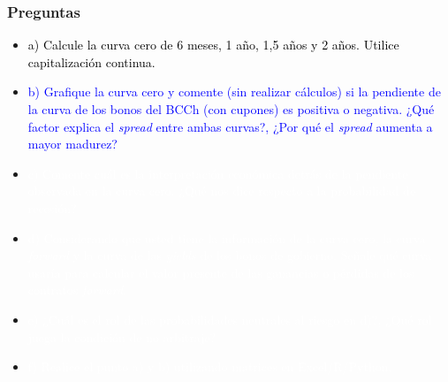 \documentclass{beamer}
\begin{document}
\begin{frame}
  \frametitle{Preguntas}
  \begin{itemize}
    \scriptsize
    \item {\textcolor{black}{a) Calcule la curva cero de 6 meses, 1 año, 1,5 años y 2 años. Utilice capitalización continua.}}
    \vspace{3pt}
    \item {\Large\textcolor{blue}{b) Grafique la curva cero y comente (sin realizar cálculos) 
    si la pendiente de la curva de los bonos del BCCh (con cupones) es positiva o negativa. 
    ¿Qué factor explica el \textit{spread} entre ambas curvas?, ¿Por qué el \textit{spread} 
    aumenta a mayor madurez?}}
    \vspace{3pt}
    \item {\textcolor{white}{c) Comente cuál es la interpretación económica detrás de la pendiente observada en la curva cero. ¿Qué nos dice respecto a la probabilidad de recesión?}}
    \vspace{3pt}
    \item {\textcolor{white}{d) Considerando que usted tiene la información de la curva cero, la curva \textit{forward} y la curva de las \textit{yields} de los bonos de gobierno. Señale qué curva usaría para calcular el valor presente de las ganancias o pérdidas de los contratos \textit{forward}.}}
    \vspace{3pt}
    \item {\textcolor{white}{e) ¿Cuál es el rol de las probabilidades neutrales al riesgo en d)?, ¿Qué rol juega la condición de no arbitraje?}}
    \vspace{3pt}
    \item {\textcolor{white}{f) Realice el punto a) y b)  utilizando matrices en Excel/R/Python.}}
    \vspace{3pt}
  \end{itemize}
\end{frame}

\pgfmathsetmacro{\fwdseisuno}{(\paii*\Tuno - \pai*\Tseis)/(\Tuno - \Tseis)}
\pgfmathsetmacro{\fwdunounocinco}{(\paiii*\TunoCinco - \paii*\Tuno)/(\TunoCinco - \Tuno)}
\pgfmathsetmacro{\fwdunocincoDos}{(\paiv*\Tdos - \paiii*\TunoCinco)/(\Tdos - \TunoCinco)}
\end{document}
